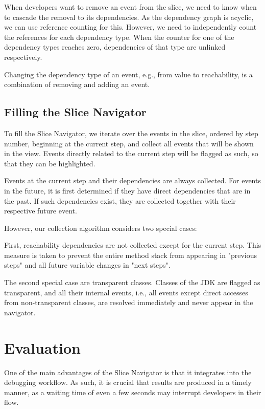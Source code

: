 ﻿\documentclass[
      english,
			conference,
      ]{IEEEtran}
\begin{document}
When developers want to remove an event from the slice, we need to know when to cascade the removal to its dependencies.
As the dependency graph is acyclic, we can use reference counting for this.
However, we need to independently count the references for each dependency type.
When the counter for one of the dependency types reaches zero, dependencies of that type are unlinked respectively.

Changing the dependency type of an event, e.g., from value to reachability, is a combination of removing and adding an event.

\subsection{Filling the Slice Navigator}

To fill the Slice Navigator, we iterate over the events in the slice, ordered by step number, beginning at the current step, and collect all events that will be shown in the view.
Events directly related to the current step will be flagged as such, so that they can be highlighted.

Events at the current step and their dependencies are always collected.
For events in the future, it is first determined if they have direct dependencies that are in the past.
If such dependencies exist, they are collected together with their respective future event.

However, our collection algorithm considers two special cases:

First, reachability dependencies are not collected except for the current step.
This measure is taken to prevent the entire method stack from appearing in "previous steps" and all future variable changes in "next steps".

The second special case are transparent classes.
Classes of the JDK are flagged as transparent, and all their internal events, i.e., all events except direct accesses from non-transparent classes, are resolved immediately and never appear in the navigator.


\section{Evaluation}
\label{sec:eval}

One of the main advantages of the Slice Navigator is that it integrates into the debugging workflow.
As such, it is crucial that results are produced in a timely manner, as a waiting time of even a few seconds may interrupt developers in their flow.
\end{document}
